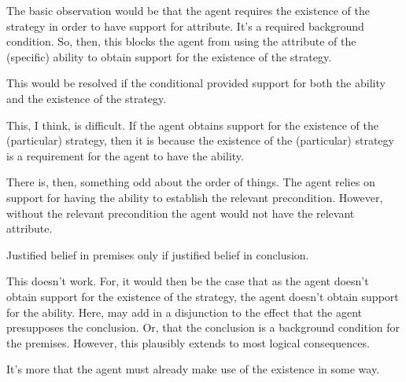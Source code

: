 \documentclass[10pt]{article}
\begin{document}
\begin{note}[Hum]
  The basic observation would be that the agent requires the existence of the strategy in order to have support for attribute.
  It's a required background condition.
  So, then, this blocks the agent from using the attribute of the (specific) ability to obtain support for the existence of the strategy.

  This would be resolved if the conditional provided support for both the ability and the existence of the strategy.

  This, I think, is difficult.
  If the agent obtains support for the existence of the (particular) strategy, then it is because the existence of the (particular) strategy is a requirement for the agent to have the ability.

  There is, then, something odd about the order of things.
  The agent relies on support for having the ability to establish the relevant precondition.
  However, without the relevant precondition the agent would not have the relevant attribute.
\end{note}


\begin{note}[Sgaravatti]
  Justified belief in premises only if justified belief in conclusion.

  This doesn't work.
  For, it would then be the case that as the agent doesn't obtain support for the existence of the strategy, the agent doesn't obtain support for the ability.
  Here, may add in a disjunction to the effect that the agent presupposes the conclusion.
  Or, that the conclusion is a background condition for the premises.
  However, this plausibly extends to most logical consequences.

  It's more that the agent must already make use of the existence in some way.
\end{note}
\end{document}
